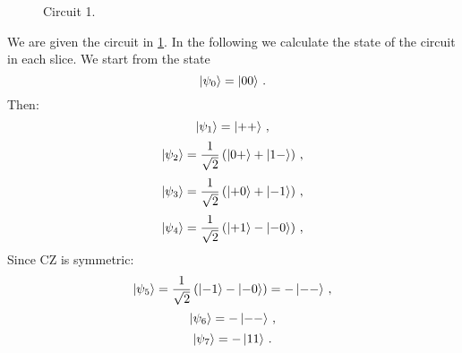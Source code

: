 \begin{figure}[h]
    \centering

    \caption{Circuit 1.}
        \label{fig:circuit_1}
\end{figure}
We are given the circuit in \cref{fig:circuit_1}. In the following we calculate the state of 
the circuit in each slice.
We start from the state
\begin{equation}
    \ket{\psi_0} = \ket{00}  \, .
\end{equation}
Then:
\begin{equation}
        \ket{\psi_1} = \ket{++} \, ,
\end{equation}
\begin{equation}
        \ket{\psi_2} = \frac{1}{\sqrt{2}} \left( \ket{0+} + \ket{1-}\right) \, ,
\end{equation}
\begin{equation}
        \ket{\psi_3} = \frac{1}{\sqrt{2}} \left( \ket{+0} + \ket{-1} \right) \, ,
\end{equation}
\begin{equation}
        \ket{\psi_4} = \frac{1}{\sqrt{2}} \left( \ket{+1} - \ket{-0} \right)  \, ,
\end{equation}
Since CZ is symmetric:
\begin{equation}
        \ket{\psi_5} =  \frac{1}{\sqrt{2}} \left( \ket{-1} - \ket{-0} \right) =  - \ket{--} \, ,
\end{equation}
\begin{equation}
        \ket{\psi_6} = - \ket{--} \, ,
\end{equation}
\begin{equation}
        \ket{\psi_7} = - \ket{11} \, .
\end{equation}

